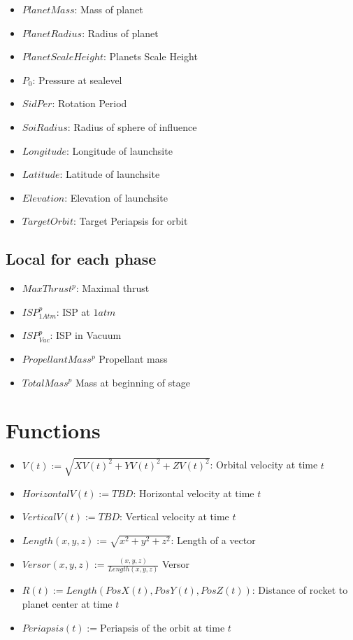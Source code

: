 \documentclass[11pt]{report}
\begin{document}
\begin{itemize}
\item $PlanetMass$: Mass of planet
\item $PlanetRadius$: Radius of planet
\item $PlanetScaleHeight$: Planets Scale Height
\item $P_0$: Pressure at sealevel
\item $SidPer$: Rotation Period
\item $SoiRadius$: Radius of sphere of influence
\item $Longitude$: Longitude of launchsite
\item $Latitude$: Latitude of launchsite
\item $Elevation$: Elevation of launchsite
\item $TargetOrbit$: Target Periapsis for orbit
\end{itemize}

\subsection{Local for each phase}

\begin{itemize}
\item $MaxThrust^p$: Maximal thrust
\item $ISP_{1Atm}^p$: ISP at $1 atm$
\item $ISP_{Vac}^p$: ISP in Vacuum
\item $PropellantMass^p$ Propellant mass
\item $TotalMass^p$ Mass at beginning of stage
\end{itemize}

\section{Functions}

\begin{itemize}
\item $V(t) := \sqrt{XV(t)^2 + YV(t)^2+ ZV(t)^2}$: Orbital velocity at time $t$
\item $HorizontalV(t) := TBD$: Horizontal velocity at time $t$
\item $VerticalV(t) := TBD$: Vertical velocity at time $t$
\item $Length(x, y, z) := \sqrt{x^2 + y^2 + z^2}$: Length of a vector
\item $Versor(x, y, z) := \frac{(x, y, z)}{Length(x, y, z)}$ Versor
\item $R(t) := Length(PosX(t), PosY(t), PosZ(t))$: Distance of rocket to planet center at time $t$
\item $Periapsis(t) := \textrm{Periapsis of the orbit at time } t$
\end{itemize}
\end{document}
